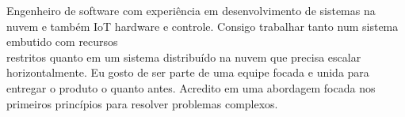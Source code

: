 \documentclass[9pt]{developercv} %
\begin{document}
\vspace{0.5cm}



\begin{minipage}[t]{0.4\textwidth} %
	\vspace{-\baselineskip} %

	Engenheiro de software com experiência em desenvolvimento de 
	sistemas na nuvem e também IoT hardware e controle. 
	Consigo trabalhar tanto num sistema embutido com 
	recursos \\ restritos quanto em um sistema distribuído na nuvem
	que precisa escalar horizontalmente. Eu gosto de ser parte 
	de uma equipe focada e unida para entregar o produto o quanto 
	antes. Acredito em uma abordagem focada nos primeiros princípios
	para resolver problemas complexos. 
\end{minipage}
\hfill %
\begin{minipage}[t]{0.5\textwidth} %
	\vspace{-\baselineskip} %
	\begin{barchart}{5.5}
	\end{barchart}
\end{minipage}

\begin{center}
\end{center}


\end{document}
